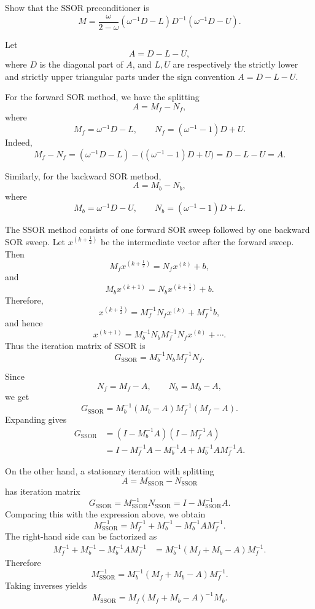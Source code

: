 \documentclass{ctexart}
\begin{document}
\begin{problem}\label{pro:4}
  Show that the SSOR preconditioner is
  \[
    M
    =
    \frac{\omega}{2-\omega}
    \left(\omega^{-1}D-L\right)
    D^{-1}
    \left(\omega^{-1}D-U\right).
  \]
\end{problem}
\begin{solution}
  Let
  \[
    A=D-L-U,
  \]
  where \(D\) is the diagonal part of \(A\), and \(L,U\) are respectively
  the strictly lower and strictly upper triangular parts under the sign
  convention \(A=D-L-U\).

  For the forward SOR method, we have the splitting
  \[
    A=M_f-N_f,
  \]
  where
  \[
    M_f=\omega^{-1}D-L,
    \qquad
    N_f=(\omega^{-1}-1)D+U.
  \]
  Indeed,
  \[
    M_f-N_f
    =
    (\omega^{-1}D-L)-\bigl((\omega^{-1}-1)D+U\bigr)
    =
    D-L-U
    =
    A.
  \]

  Similarly, for the backward SOR method,
  \[
    A=M_b-N_b,
  \]
  where
  \[
    M_b=\omega^{-1}D-U,
    \qquad
    N_b=(\omega^{-1}-1)D+L.
  \]

  The SSOR method consists of one forward SOR sweep followed by one
  backward SOR sweep. Let \(x^{(k+\frac12)}\) be the intermediate vector
  after the forward sweep. Then
  \[
    M_f x^{(k+\frac12)}
    =
    N_f x^{(k)}+b,
  \]
  and
  \[
    M_b x^{(k+1)}
    =
    N_b x^{(k+\frac12)}+b.
  \]
  Therefore,
  \[
    x^{(k+\frac12)}
    =
    M_f^{-1}N_f x^{(k)}+M_f^{-1}b,
  \]
  and hence
  \[
    x^{(k+1)}
    =
    M_b^{-1}N_bM_f^{-1}N_f x^{(k)}+\cdots .
  \]
  Thus the iteration matrix of SSOR is
  \[
    G_{\mathrm{SSOR}}
    =
    M_b^{-1}N_bM_f^{-1}N_f.
  \]

  Since
  \[
    N_f=M_f-A,
    \qquad
    N_b=M_b-A,
  \]
  we get
  \[
    G_{\mathrm{SSOR}}
    =
    M_b^{-1}(M_b-A)M_f^{-1}(M_f-A).
  \]
  Expanding gives
  \[
    \begin{aligned}
      G_{\mathrm{SSOR}}
      &=
      (I-M_b^{-1}A)(I-M_f^{-1}A) \\
      &=
      I-M_f^{-1}A-M_b^{-1}A
      +M_b^{-1}AM_f^{-1}A.
    \end{aligned}
  \]

  On the other hand, a stationary iteration with splitting
  \[
    A=M_{\mathrm{SSOR}}-N_{\mathrm{SSOR}}
  \]
  has iteration matrix
  \[
    G_{\mathrm{SSOR}}
    =
    M_{\mathrm{SSOR}}^{-1}N_{\mathrm{SSOR}}
    =
    I-M_{\mathrm{SSOR}}^{-1}A.
  \]
  Comparing this with the expression above, we obtain
  \[
    M_{\mathrm{SSOR}}^{-1}
    =
    M_f^{-1}+M_b^{-1}-M_b^{-1}AM_f^{-1}.
  \]
  The right-hand side can be factorized as
  \[
    \begin{aligned}
      M_f^{-1}+M_b^{-1}-M_b^{-1}AM_f^{-1}
      &=
      M_b^{-1}(M_f+M_b-A)M_f^{-1}.
    \end{aligned}
  \]
  Therefore
  \[
    M_{\mathrm{SSOR}}^{-1}
    =
    M_b^{-1}(M_f+M_b-A)M_f^{-1}.
  \]
  Taking inverses yields
  \[
    M_{\mathrm{SSOR}}
    =
    M_f(M_f+M_b-A)^{-1}M_b.
  \]


\end{solution}
\end{document}
